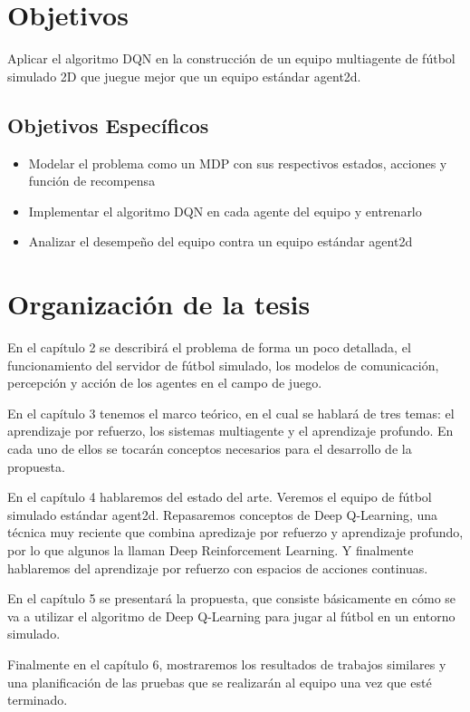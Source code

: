 \section{Objetivos}

Aplicar el algoritmo \ac{DQN} en la construcción de un equipo multiagente de fútbol simulado 2D que juegue mejor que un equipo estándar agent2d.


\subsection{Objetivos Específicos}

\begin{itemize}
\item Modelar el problema como un \ac{MDP} con sus respectivos estados, acciones y función de recompensa
\item Implementar el algoritmo \ac{DQN} en cada agente del equipo y entrenarlo
\item Analizar el desempeño del equipo contra un equipo estándar agent2d
\end{itemize}


\section{Organización de la tesis}

En el capítulo 2 se describirá el problema de forma un poco detallada, el funcionamiento del servidor de fútbol simulado, los modelos de comunicación, percepción y acción de los agentes en el campo de juego.

En el capítulo 3 tenemos el marco teórico, en el cual se hablará de tres temas: el aprendizaje por refuerzo, los sistemas multiagente y el aprendizaje profundo. En cada uno de ellos se tocarán conceptos necesarios para el desarrollo de la propuesta.

En el capítulo 4 hablaremos del estado del arte. Veremos el equipo de fútbol simulado estándar agent2d. Repasaremos conceptos de Deep Q-Learning, una técnica muy reciente que combina apredizaje por refuerzo y aprendizaje profundo, por lo que algunos la llaman Deep Reinforcement Learning. Y finalmente hablaremos del aprendizaje por refuerzo con espacios de acciones continuas.

En el capítulo 5 se presentará la propuesta, que consiste básicamente en cómo se va a utilizar el algoritmo de Deep Q-Learning para jugar al fútbol en un entorno simulado.

Finalmente en el capítulo 6, mostraremos los resultados de trabajos similares y una planificación de las pruebas que se realizarán al equipo una vez que esté terminado.
